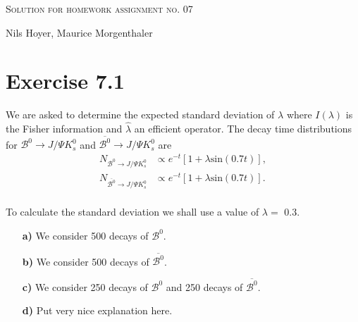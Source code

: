 \documentclass[10pt]{article}
\newenvironment{myfont}{\fontfamily{put}\selectfont}{\par}
\begin{document}
\begin{myfont}

\begin{center}
  \begin{Large}
    \textsc{Solution for homework assignment no. 07} \\
  \end{Large}
	\vspace*{0.4cm}
    Nils Hoyer, Maurice Morgenthaler
  \vspace*{1cm}
\end{center}

\section*{Exercise 7.1}

We are asked to determine the expected standard deviation of $\lambda$ where $I(\lambda)$ is the Fisher information and $\hat{\lambda}$ an efficient operator.
The decay time distributions for $\mathcal{B}^{0} \rightarrow J/\Psi K_{s}^{0}$ and $\overline{\mathcal{B}^{0}} \rightarrow J/\Psi K_{s}^{0}$ are
\begin{align*}
N_{\mathcal{B}^{0} \rightarrow J/\Psi K_{s}^{0}} & \propto e^{-t}\left[1 + \lambda\textrm{sin}(\num{0.7}t)\right], \\
N_{\overline{\mathcal{B}^{0}} \rightarrow J/\Psi K_{s}^{0}} & \propto e^{-t}\left[1 + \lambda\textrm{sin}(\num{0.7}t)\right]. \\
\end{align*}

\noindent To calculate the standard deviation we shall use a value of $\lambda =$ \num{0.3}.

\begin{itemize}
  \item[\textbf{a)}] We consider \num{500} decays of $\mathcal{B}^{0}$.

  \item[\textbf{b)}] We consider \num{500} decays of $\overline{\mathcal{B}^{0}}$.

  \item[\textbf{c)}] We consider \num{250} decays of $\mathcal{B}^{0}$ and \num{250} decays of $\overline{\mathcal{B}^{0}}$.

  \item[\textbf{d)}] Put very nice explanation here.
\end{itemize}



\end{myfont}
\end{document}
